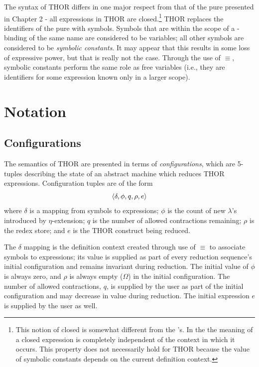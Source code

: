 The syntax of THOR differs in one major respect from that of the pure
\lambdacalculus{} presented in Chapter 2 - all expressions in THOR are
closed.\footnote{This notion of closed is somewhat different from the
\lambdacalculus's. In the \lambdacalculus{} the meaning of a closed expression
is completely independent of the context in which it occurs. This property does
not necessarily hold for THOR because the value of symbolic constants depends
on the current definition context.} THOR replaces the identifiers of the pure
\lambdacalculus{} with symbols. Symbols that are within the scope of a
-binding of the same name are considered to be variables; all other
symbols are considered to be \emph{symbolic constants}. It may appear that this results
in some loss of expressive power, but that is really not the case. Through the
use of \(\equiv\), symbolic constants perform the same role as free variables (i.e.,
they are identifiers for some expression known only in a larger scope).

\section{Notation}

\subsection{Configurations}

The semantics of THOR are presented in terms of \emph{configurations}, which are
5-tuples describing the state of an abstract machine which reduces THOR
expressions. Configuration tuples are of the form
\[
\langle \delta,\phi,q,\rho,e\rangle
\]
where \(\delta\) is a mapping from symbols to expressions; \(\phi\) is the count
of new \(\lambda\)'s introduced by \(\eta\)-extension; \(q\) is the number of
allowed contractions remaining; \(\rho\) is the redex store; and \(e\) is the
THOR construct being reduced.

The \(\delta\) mapping is the definition context created through use of \(\equiv\) to
associate symbols to expressions; its value is supplied as part of every
reduction sequence's initial configuration and remains invariant during
reduction. The initial value of \(\phi\) is always zero, and \(\rho\) is always
empty (\(\Omega\)) in the initial configuration. The number of allowed
contractions, \(q\), is supplied by the user as part of the initial
configuration and may decrease in value during reduction. The initial expression
\(e\) is supplied by the user as well.

